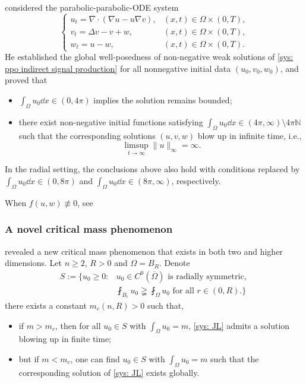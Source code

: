 
\begin{frame}
 considered the parabolic-parabolic-ODE system
\begin{equation}\label{sys: ppo indirect signal production}
	\begin{cases}
		u_t = \nabla\cdot(\nabla u - u\nabla v), & (x, t)\in \Omega\times(0, T),\\
		v_t = \Delta v - v + w, & (x, t)\in \Omega\times(0, T),\\
		w_t = u - w, & (x, t)\in \Omega\times(0, T).
	\end{cases}
\end{equation}
He established  the global well-posedness of non-negative weak solutions of \eqref{sys: ppo indirect signal production} for all nonnegative initial data $(u_0,v_0,w_0)$, and proved that
\begin{itemize}
\item $\int_\Omega u_0\dd{x}\in(0, 4\pi)$ implies the solution remains bounded;
\item there exist non-negative initial functions satisfying $\int_\Omega u_0\dd{x}\in(4\pi,\infty)\setminus4\pi\mathbb{N}$ such that the corresponding solutions $(u,v,w)$ blow up in infinite time, i.e., $$\limsup_{t\to\infty}\|{u}\|_{\infty}=\infty.$$
\end{itemize}
In the radial setting, the conclusions above also hold with conditions replaced by $\int_\Omega u_0\dd{x}\in(0, 8\pi)$ and $\int_\Omega u_0\dd{x}\in(8\pi, \infty)$, respectively.

When \(f(u,w)\not\equiv0\), see 
\end{frame}


\begin{frame}
\frametitle{A novel critical mass phenomenon}
 revealed a new critical mass phenomenon that exists in both two and higher dimensions. Let $n\geqslant 2$, $R>0$ and $\Omega=B_R$. Denote
\begin{align*}
	S:=\biggl\{u_0\geqslant0 : &u_0\in C^0(\overline{\Omega}) \text{ is radially symmetric, } \\ &\fint_{B_r}u_0\gneqq \fint_{\Omega}u_0 \text{ for all } r\in(0, R).\biggr\}
\end{align*}
there exists a constant $m_c(n, R) > 0$ such that, 
\begin{itemize}
    \item if $m>m_c$, then for \alert{all}
$u_0\in S$
with $\int_\Omega u_0 = m$, 
 \eqref{sys: JL} admits a solution blowing up in finite time; 
    \item but if $m<m_c$, one can find $u_0\in S$ with $\int_\Omega u_0 = m$ such that the corresponding solution of \eqref{sys: JL} exists globally.
 \end{itemize}
\end{frame}

